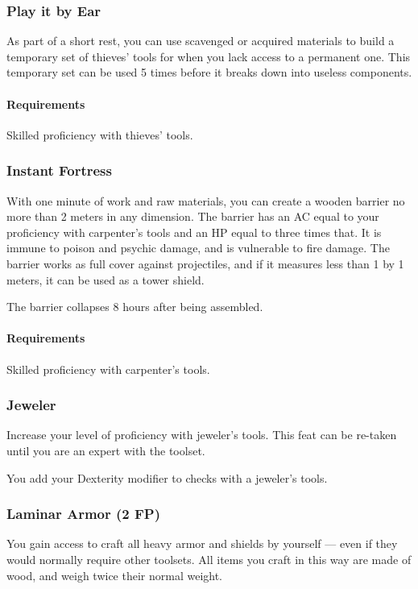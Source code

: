\subsubsection{Play it by Ear} \label{feat::playitbyear}
    As part of a short rest, you can use scavenged or acquired materials to build a temporary set of thieves' tools for when you lack access to a permanent one.
    This temporary set can be used 5 times before it breaks down into useless components.
    \paragraph{Requirements} Skilled proficiency with thieves' tools.
\subsubsection{Instant Fortress} \label{feat::instantfortress}
    With one minute of work and raw materials, you can create a wooden barrier no more than 2 meters in any dimension.
    The barrier has an AC equal to your proficiency with carpenter's tools and an HP equal to three times that.
    It is immune to poison and psychic damage, and is vulnerable to fire damage.
    The barrier works as full cover against projectiles, and if it measures less than 1 by 1 meters, it can be used as a tower shield.

    The barrier collapses 8 hours after being assembled.
    \paragraph{Requirements} Skilled proficiency with carpenter's tools.
\subsubsection{Jeweler} \label{feat::jeweler}
    Increase your level of proficiency with jeweler's tools.
    This feat can be re-taken until you are an expert with the toolset.

    You add your Dexterity modifier to checks with a jeweler's tools.
\subsubsection{Laminar Armor (2 FP)} \label{feat::laminararmor}
    You gain access to craft all heavy armor and shields by yourself --- even if they would normally require other toolsets.
    All items you craft in this way are made of wood, and weigh twice their normal weight.

